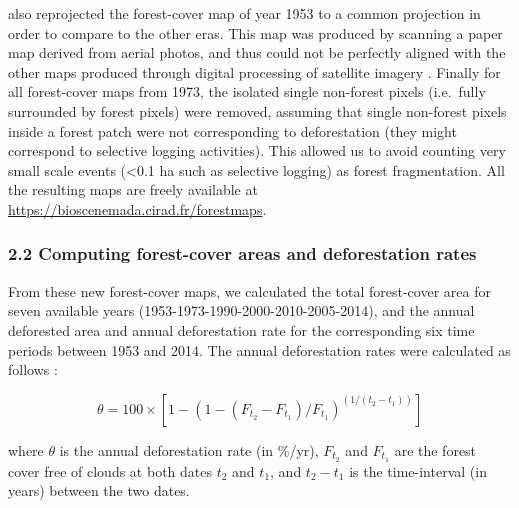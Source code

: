 \documentclass[]{article}
\begin{document}
also reprojected the forest-cover map of year 1953 to a common
projection in order to compare to the other eras. This map was produced
by scanning a paper map derived from aerial photos, and thus could not
be perfectly aligned with the other maps produced through digital
processing of satellite imagery \citep{Harper2007}. Finally for all
forest-cover maps from 1973, the isolated single non-forest pixels
(i.e.~fully surrounded by forest pixels) were removed, assuming that
single non-forest pixels inside a forest patch were not corresponding to
deforestation (they might correspond to selective logging activities).
This allowed us to avoid counting very small scale events
(\textless{}0.1 ha such as selective logging) as forest fragmentation.
All the resulting maps are freely available at
\url{https://bioscenemada.cirad.fr/forestmaps}.

\hypertarget{computing-forest-cover-areas-and-deforestation-rates}{%
\subsubsection{2.2 Computing forest-cover areas and deforestation
rates}\label{computing-forest-cover-areas-and-deforestation-rates}}

From these new forest-cover maps, we calculated the total forest-cover
area for seven available years (1953-1973-1990-2000-2010-2005-2014), and
the annual deforested area and annual deforestation rate for the
corresponding six time periods between 1953 and 2014. The annual
deforestation rates were calculated as follows
\citep{Puyravaud2003, Vieilledent2013}:

\[\theta = 100 \times [1-(1-(F_{t_2}-F_{t_1})/F_{t_1})^{(1/(t_2-t_1))}]\]

where \(\theta\) is the annual deforestation rate (in \%/yr),
\(F_{t_2}\) and \(F_{t_1}\) are the forest cover free of clouds at both
dates \(t_2\) and \(t_1\), and \(t_2-t_1\) is the time-interval (in
years) between the two dates.
\end{document}
